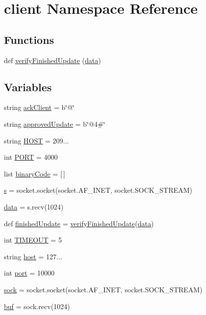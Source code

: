 \hypertarget{namespaceclient}{}\section{client Namespace Reference}
\label{namespaceclient}
\subsection*{Functions}
\begin{DoxyCompactItemize}
\item 
def \hyperlink{namespaceclient_aa133740df708d11451616cdd39a08b91}{verify\+Finished\+Update} (\hyperlink{namespaceclient_ade2c74246e97a6a8badb63b11888eb96}{data})
\end{DoxyCompactItemize}
\subsection*{Variables}
\begin{DoxyCompactItemize}
\item 
string \hyperlink{namespaceclient_a25ca49ee73998b47f449af9549f4634e}{ack\+Client} = b\char`\"{}@\char`\"{}
\item 
string \hyperlink{namespaceclient_a245a3a9a5536dcbb58fd7a83934854d3}{approved\+Update} = b\char`\"{}@4\#\char`\"{}
\item 
string \hyperlink{namespaceclient_ad39c4666bbab8c2e37b88274a0eaf7ba}{H\+O\+ST} = \textquotesingle{}209...\textquotesingle{}
\item 
int \hyperlink{namespaceclient_acd2f280864b8945bb46e196ed2b0990a}{P\+O\+RT} = 4000
\item 
list \hyperlink{namespaceclient_abf9b35467956bfa36acd984aace33449}{binary\+Code} = \mbox{[}$\,$\mbox{]}
\item 
\hyperlink{namespaceclient_ad4a7c4191c3c65a9bdc2ac03d3464f13}{s} = socket.\+socket(socket.\+A\+F\+\_\+\+I\+N\+ET, socket.\+S\+O\+C\+K\+\_\+\+S\+T\+R\+E\+AM)
\item 
\hyperlink{namespaceclient_ade2c74246e97a6a8badb63b11888eb96}{data} = s.\+recv(1024)
\item 
def \hyperlink{namespaceclient_acb1b64fab7439cf2fdc191f31daa8353}{finished\+Update} = \hyperlink{namespaceclient_aa133740df708d11451616cdd39a08b91}{verify\+Finished\+Update}(\hyperlink{namespaceclient_ade2c74246e97a6a8badb63b11888eb96}{data})
\item 
int \hyperlink{namespaceclient_a1e07168544409bc8bf0b656eebc8e888}{T\+I\+M\+E\+O\+UT} = 5
\item 
string \hyperlink{namespaceclient_affd1b2de2616b92fa875ddb4f94f21a0}{host} = \textquotesingle{}127...\textquotesingle{}
\item 
int \hyperlink{namespaceclient_ad13ec39ec5b973ae74c855e52b1e5652}{port} = 10000
\item 
\hyperlink{namespaceclient_ad8df363cc6c2fdd1e4f4f3b3d9d0c8fd}{sock} = socket.\+socket(socket.\+A\+F\+\_\+\+I\+N\+ET, socket.\+S\+O\+C\+K\+\_\+\+S\+T\+R\+E\+AM)
\item 
\hyperlink{namespaceclient_a09b2af09e6bb63b2b014637b5b4e2936}{buf} = sock.\+recv(1024)
\end{DoxyCompactItemize}


